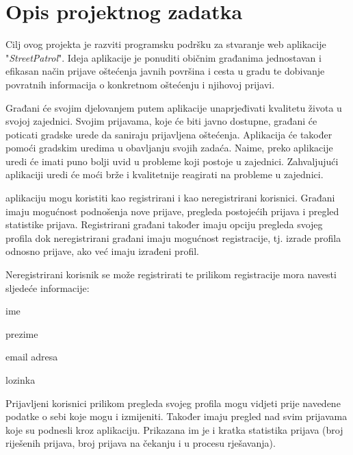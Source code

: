 \chapter{Opis projektnog zadatka}
		
		Cilj ovog projekta je razviti programsku podršku za stvaranje web aplikacije "\textit{StreetPatrol}". Ideja aplikacije je ponuditi običnim građanima jednostavan i efikasan način prijave oštećenja javnih površina i cesta u gradu te dobivanje povratnih informacija o konkretnom oštećenju i njihovoj prijavi. 
		
		Građani će svojim djelovanjem putem aplikacije unaprjeđivati kvalitetu života u svojoj zajednici. Svojim prijavama, koje će biti javno dostupne, građani će poticati gradske urede da saniraju prijavljena oštećenja. Aplikacija će također pomoći gradskim uredima u obavljanju svojih zadaća. Naime, preko aplikacije uredi će imati puno bolji uvid u probleme koji postoje u zajednici. Zahvaljujući aplikaciji uredi će moći brže i kvalitetnije reagirati na probleme u zajednici.
		
		 aplikaciju mogu koristiti kao registrirani i kao neregistrirani korisnici. Građani imaju mogućnost podnošenja nove prijave, pregleda postojećih prijava i pregled statistike prijava. Registrirani građani također imaju opciju pregleda svojeg profila dok neregistrirani građani imaju mogućnost registracije, tj. izrade profila odnosno prijave, ako već imaju izrađeni profil.
		
		Neregistrirani korisnik se može registrirati te prilikom registracije mora navesti sljedeće informacije:
		\begin{packed_item} 
			\item ime
			\item prezime
			\item email adresa
			\item lozinka
		\end{packed_item}  
		Prijavljeni korisnici prilikom pregleda svojeg profila mogu vidjeti prije navedene podatke o sebi koje mogu i izmijeniti. Također imaju pregled nad svim prijavama koje su podnesli kroz aplikaciju. Prikazana im je i kratka statistika prijava (broj riješenih prijava, broj prijava na čekanju i u procesu rješavanja). 
		
